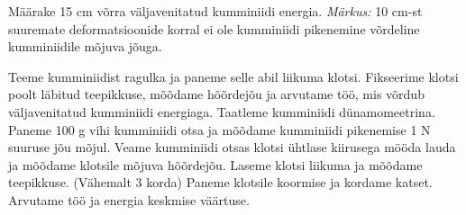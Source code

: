 
Määrake 15 cm võrra väljavenitatud kumminiidi energia.
\textit{Märkus:} 10 cm-st suuremate deformatsioonide korral ei ole kumminiidi pikenemine võrdeline kumminiidile mõjuva jõuga.

\hint

\solu
Teeme kumminiidist ragulka ja paneme selle abil liikuma klotsi. Fikseerime klotsi poolt läbitud teepikkuse, mõõdame hõõrdejõu ja arvutame töö, mis võrdub väljavenitatud kumminiidi energiaga. Taatleme kumminiidi dünamomeetrina. Paneme 100 g vihi kumminiidi otsa ja mõõdame kumminiidi pikenemise 1 N suuruse jõu mõjul. Veame kumminiidi otsas klotsi ühtlase kiirusega mööda lauda ja mõõdame klotsile mõjuva hõõrdejõu. Laseme klotsi liikuma ja mõõdame teepikkuse. (Vähemalt 3 korda) Paneme klotsile koormise ja kordame katset. Arvutame töö ja energia keskmise väärtuse.
\probend
